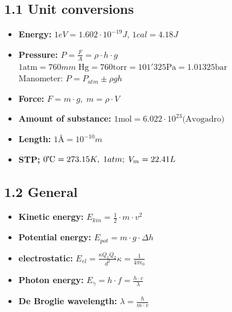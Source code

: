 \subsection{1.1 Unit conversions}
	\begin{itemize}
		\itemsep0em
		\raggedright
  		\item \textbf{Energy:} $1eV=1.602\cdot 10^{-19}J$,    $1cal=4.18J$
    	\item \textbf{Pressure:} $P = \frac{F}{A} = \rho \cdot h \cdot g$\\ $1 \textrm{atm} = 760mm \; \textrm{Hg} = 760 \textrm{torr} = 101'325 \textrm{Pa} = 1.01325 \textrm{bar}$\\ Manometer: $P = P_{atm}\pm \rho g h$
    	\item \textbf{Force:} $F = m \cdot g, \; m = \rho \cdot V$
		\item \textbf{Amount of substance:} $1 \textrm{mol} = 6.022\cdot 10^{23} \textrm{(Avogadro)}$
    	\item \textbf{Length:} $1\text{Å}=10^{-10}m$
    	\item \textbf{STP; } $0\tccentigrade = 273.15K, \; 1atm; \; V_m = 22.41L$
	\end{itemize}

\subsection{1.2 General}
    \begin{itemize}
		\itemsep0em
        \item \textbf{Kinetic energy:} $E_{kin} = \frac{1}{2} \cdot m \cdot v^2$
        \item \textbf{Potential energy:} $E_{pot} = m \cdot g \cdot \Delta h$
        \item \textbf{electrostatic:} $E_{el}=\frac{\kappa Q_1Q_2}{d^2}$\quad $\kappa = \frac{1}{4\pi \epsilon_0}$
        \item \textbf{Photon energy: } $E_\gamma = h\cdot f = \frac{h\cdot c}{\lambda}$
        \item \textbf{De Broglie wavelength: } $\lambda = \frac{h}{m\cdot v}$
    \end{itemize}
    	
